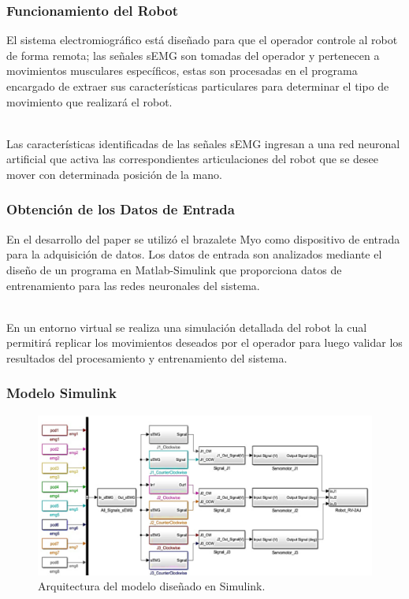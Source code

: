 \documentclass{beamer}
\begin{document}
    \begin{frame}
        \frametitle{Funcionamiento del Robot}
        \hspace*{20pt}El sistema electromiográfico está diseñado para que el operador controle al robot de forma remota; 
        las señales sEMG son tomadas del operador y pertenecen a movimientos musculares específicos, estas son procesadas en 
        el programa encargado de extraer sus características particulares para determinar el tipo de movimiento que realizará 
        el robot.\\~\
        
        \hspace*{20pt}Las características identificadas de las señales sEMG ingresan a una red neuronal artificial que activa las 
        correspondientes articulaciones del robot que se desee mover con determinada posición de la mano.
    \end{frame} 

    \begin{frame}
        \frametitle{Obtención de los Datos de Entrada}
        \hspace*{20pt}En el desarrollo del paper se utilizó el brazalete Myo como dispositivo de entrada para la adquisición de datos. 
        Los datos de entrada son analizados mediante el diseño de un programa en Matlab-Simulink que proporciona datos de 
        entrenamiento para las redes neuronales del sistema.\\~\
        
        \hspace*{20pt}En un entorno virtual se realiza una simulación detallada del robot la cual permitirá 
        replicar los movimientos deseados por el operador para luego validar los resultados del procesamiento y entrenamiento 
        del sistema. 
    \end{frame}
    
    \begin{frame}
        \frametitle{Modelo Simulink}
        \begin{figure}
            \centering
            \includegraphics[scale=0.23]{simulink-model.png}
            \caption{Arquitectura del modelo diseñado en Simulink.}
        \end{figure}
    \end{frame} 
\end{document}
